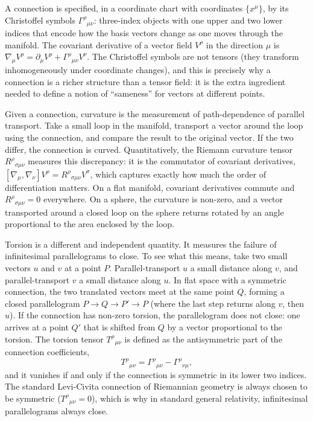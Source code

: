 \documentclass[%
 reprint,
 amsmath,amssymb,
 aps,
 prb,
]{revtex4-2}
\numberwithin{equation}{section}
\begin{document}
A connection is specified, in a coordinate chart with coordinates $\{x^\mu\}$, by its Christoffel symbols $\Gamma^\rho{}_{\mu\nu}$: three-index objects with one upper and two lower indices that encode how the basis vectors change as one moves through the manifold. The covariant derivative of a vector field $V^\rho$ in the direction $\mu$ is $\nabla_\mu V^\rho = \partial_\mu V^\rho + \Gamma^\rho{}_{\mu\nu} V^\nu$. The Christoffel symbols are not tensors (they transform inhomogeneously under coordinate changes), and this is precisely why a connection is a richer structure than a tensor field: it is the extra ingredient needed to define a notion of ``sameness'' for vectors at different points.

Given a connection, curvature is the measurement of path-dependence of parallel transport. Take a small loop in the manifold, transport a vector around the loop using the connection, and compare the result to the original vector. If the two differ, the connection is curved. Quantitatively, the Riemann curvature tensor $R^\rho{}_{\sigma\mu\nu}$ measures this discrepancy: it is the commutator of covariant derivatives, $[\nabla_\mu, \nabla_\nu] V^\rho = R^\rho{}_{\sigma\mu\nu} V^\sigma$, which captures exactly how much the order of differentiation matters. On a flat manifold, covariant derivatives commute and $R^\rho{}_{\sigma\mu\nu} = 0$ everywhere. On a sphere, the curvature is non-zero, and a vector transported around a closed loop on the sphere returns rotated by an angle proportional to the area enclosed by the loop.

Torsion is a different and independent quantity. It measures the failure of infinitesimal parallelograms to close. To see what this means, take two small vectors $u$ and $v$ at a point $P$. Parallel-transport $u$ a small distance along $v$, and parallel-transport $v$ a small distance along $u$. In flat space with a symmetric connection, the two translated vectors meet at the same point $Q$, forming a closed parallelogram $P \to Q \to P' \to P$ (where the last step returns along $v$, then $u$). If the connection has non-zero torsion, the parallelogram does not close: one arrives at a point $Q'$ that is shifted from $Q$ by a vector proportional to the torsion. The torsion tensor $T^\rho{}_{\mu\nu}$ is defined as the antisymmetric part of the connection coefficients,
\begin{equation}
T^\rho{}_{\mu\nu} = \Gamma^\rho{}_{\mu\nu} - \Gamma^\rho{}_{\nu\mu},
\label{eq:torsion_def}
\end{equation}
and it vanishes if and only if the connection is symmetric in its lower two indices. The standard Levi-Civita connection of Riemannian geometry is always chosen to be symmetric ($T^\rho{}_{\mu\nu} = 0$), which is why in standard general relativity, infinitesimal parallelograms always close.
\end{document}
